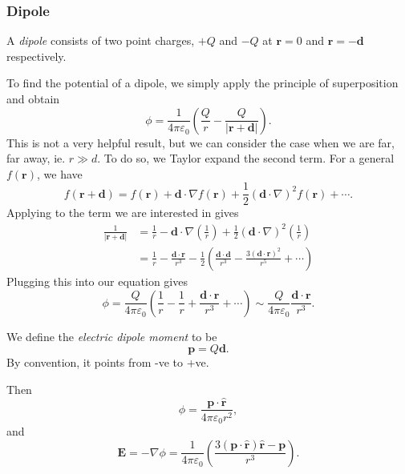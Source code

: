 \documentclass[a4paper]{article}
\begin{document}
\subsubsection{Dipole}
\begin{defi}[Dipole]
  A \emph{dipole} consists of two point charges, $+Q$ and $-Q$ at $\mathbf{r} = 0$ and $\mathbf{r} = -\mathbf{d}$ respectively.
\end{defi}

To find the potential of a dipole, we simply apply the principle of superposition and obtain
\[
  \phi = \frac{1}{4\pi\varepsilon_0}\left(\frac{Q}{r} - \frac{Q}{|\mathbf{r} + \mathbf{d}|}\right).
\]
This is not a very helpful result, but we can consider the case when we are far, far away, ie. $r \gg d$. To do so, we Taylor expand the second term. For a general $f(\mathbf{r})$, we have
\[
  f(\mathbf{r} + \mathbf{d}) = f(\mathbf{r}) + \mathbf{d}\cdot \nabla f(\mathbf{r}) + \frac{1}{2}(\mathbf{d}\cdot \nabla)^2f(\mathbf{r}) + \cdots.
\]
Applying to the term we are interested in gives
\begin{align*}
  \frac{1}{|\mathbf{r} + \mathbf{d}|} &= \frac{1}{r} - \mathbf{d}\cdot \nabla\left(\frac{1}{r}\right) + \frac{1}{2}(\mathbf{d}\cdot \nabla)^2\left(\frac{1}{r}\right)\\
  &= \frac{1}{r} - \frac{\mathbf{d}\cdot \mathbf{r}}{r^3} - \frac{1}{2}\left(\frac{\mathbf{d}\cdot \mathbf{d}}{r^3} - \frac{3(\mathbf{d}\cdot \mathbf{r})^2}{r^5} + \cdots\right)
\end{align*}
Plugging this into our equation gives
\[
  \phi = \frac{Q}{4\pi\varepsilon_0}\left(\frac{1}{r} - \frac{1}{r} + \frac{\mathbf{d}\cdot \mathbf{r}}{r^3} + \cdots\right) \sim \frac{Q}{4\pi\varepsilon_0} \frac{\mathbf{d}\cdot \mathbf{r}}{r^3}.
\]
\begin{defi}
  We define the \emph{electric dipole moment} to be
  \[
    \mathbf{p} = Q\mathbf{d}.
  \]
  By convention, it points from -ve to +ve.
\end{defi}
Then
\[
  \phi = \frac{\mathbf{p}\cdot \hat{\mathbf{r}}}{4\pi\varepsilon_0 r^2},
\]
and
\[
  \mathbf{E} = -\nabla\phi = \frac{1}{4\pi\varepsilon_0}\left(\frac{3(\mathbf{p}\cdot\hat{\mathbf{r}})\hat{\mathbf{r}} - \mathbf{p}}{r^3}\right).
\]
\end{document}
